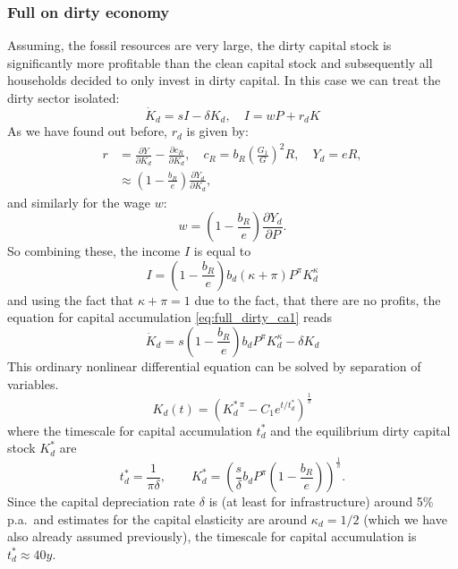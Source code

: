 \subsubsection{Full on dirty economy}
Assuming, the fossil resources are very large, the dirty capital stock is significantly more profitable than the clean capital stock and subsequently all households decided to only invest in dirty capital. In this case we can treat the dirty sector isolated:
\begin{equation}
	\dot{K}_d = s I - \delta K_d, \quad I = w P + r_d K
	\label{eq:full_dirty_ca1}
\end{equation}
As we have found out before, $r_d$ is given by:
\begin{align}
	r &= \frac{\partial Y}{\partial K_d} - \frac{\partial c_R}{\partial K_d}, \quad c_R = b_R\left( \frac{G_1}{G} \right)^{2} R, \quad Y_d = eR, \\
	&\approx \left( 1-\frac{b_R}{e} \right)\frac{\partial Y_d}{\partial K_d},
	\label{eq:full_dirty_capital_rent}
\end{align}
and similarly for the wage $w$:
\begin{equation}
	w = \left( 1-\frac{b_R}{e} \right)\frac{\partial Y_d}{\partial P}.
	\label{eq:full_dirty_wage}
\end{equation}
So combining these, the income $I$ is equal to
\begin{equation}
	I = \left( 1-\frac{b_R}{e} \right)b_d (\kappa + \pi) P^{\pi} K_d^{\kappa}
	\label{eq_full_dirty_income}
\end{equation}
and using the fact that $\kappa + \pi = 1$ due to the fact, that there are no profits, the equation for capital accumulation \eqref{eq:full_dirty_ca1} reads
\begin{equation}
	\dot{K}_d = s\left( 1 - \frac{b_R}{e} \right) b_d P^{\pi} K_d^{\kappa} - \delta K_d
	\label{eq:full_dirty_ca2}
\end{equation}
This ordinary nonlinear differential equation can be solved by separation of variables.
\begin{equation}
	K_d (t) = \left( K_d^{*\ \pi} - C_1 e^{t/t_d^{*}} \right)^{\frac{1}{\pi}}
	\label{eq:dirty_capital_ac_solution}
\end{equation}
where the timescale for capital accumulation $t^*_d$ and the equilibrium dirty capital stock $K^*_d$ are
\begin{equation}
	t_d^{*} = \frac{1}{\pi \delta}, \qquad K_d^{*} = \left( \frac{s}{\delta}b_d P^{\pi}\left(1-\frac{b_R}{e}  \right) \right)^{\frac{1}{\pi}}.
	\label{eq:dirty_capital_equilibrium_values}
\end{equation}
Since the capital depreciation rate $\delta$ is (at least for infrastructure) around 5\% p.a.\ and estimates for the capital elasticity are around $\kappa_d=1/2$ (which we have also already assumed previously), the timescale for capital accumulation is $t^*_d \approx 40 y$. \\


